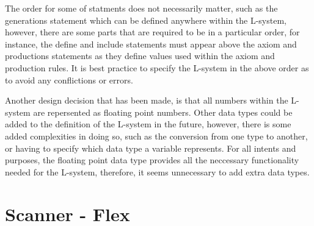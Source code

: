 \begin{flushleft}
\vspace{5mm}

The order for some of statments does not necessarily matter, such as the generations statement which can be defined anywhere within the L-system, however, there are some parts that are required to be in a particular order, for instance, the define and include statements must appear above the axiom and productions statements as they define values used within the axiom and production rules. It is best practice to specify the L-system in the above order as to avoid any conflictions or errors. \\

\vspace{5mm}

Another design decision that has been made, is that all numbers within the L-system are repersented as floating point numbers. Other data types could be added to the definition of the L-system in the future, however, there is some added complexities in doing so, such as the conversion from one type to another, or having to specify which data type a variable represents. For all intents and purposes, the floating point data type provides all the neccessary functionality needed for the L-system, therefore, it seems unnecessary to add extra data types. \\

\end{flushleft}

\section{Scanner - Flex} \label{Flex}

